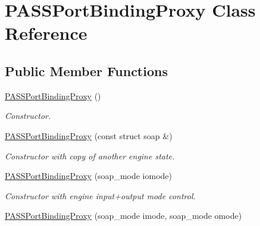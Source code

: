 \hypertarget{classPASSPortBindingProxy}{
\section{PASSPortBindingProxy Class Reference}
\label{classPASSPortBindingProxy}
}
\subsection*{Public Member Functions}
\begin{DoxyCompactItemize}
\item 
\hypertarget{classPASSPortBindingProxy_a5813f47d26e0e054366b2654d467c5c5}{
\hyperlink{classPASSPortBindingProxy_a5813f47d26e0e054366b2654d467c5c5}{PASSPortBindingProxy} ()}
\label{classPASSPortBindingProxy_a5813f47d26e0e054366b2654d467c5c5}

\begin{DoxyCompactList}\small\item\em Constructor. \item\end{DoxyCompactList}\item 
\hypertarget{classPASSPortBindingProxy_ab2e78545a0186e6a7f1435ea90abd41a}{
\hyperlink{classPASSPortBindingProxy_ab2e78545a0186e6a7f1435ea90abd41a}{PASSPortBindingProxy} (const struct soap \&)}
\label{classPASSPortBindingProxy_ab2e78545a0186e6a7f1435ea90abd41a}

\begin{DoxyCompactList}\small\item\em Constructor with copy of another engine state. \item\end{DoxyCompactList}\item 
\hypertarget{classPASSPortBindingProxy_ab2acd3b63611bb64e9a99ff0981b5412}{
\hyperlink{classPASSPortBindingProxy_ab2acd3b63611bb64e9a99ff0981b5412}{PASSPortBindingProxy} (soap\_\-mode iomode)}
\label{classPASSPortBindingProxy_ab2acd3b63611bb64e9a99ff0981b5412}

\begin{DoxyCompactList}\small\item\em Constructor with engine input+output mode control. \item\end{DoxyCompactList}\item 
\hypertarget{classPASSPortBindingProxy_a2e0bc8429e70ef87f116c95e6f5a3085}{
\hyperlink{classPASSPortBindingProxy_a2e0bc8429e70ef87f116c95e6f5a3085}{PASSPortBindingProxy} (soap\_\-mode imode, soap\_\-mode omode)}
\label{classPASSPortBindingProxy_a2e0bc8429e70ef87f116c95e6f5a3085}


\end{DoxyCompactItemize}
